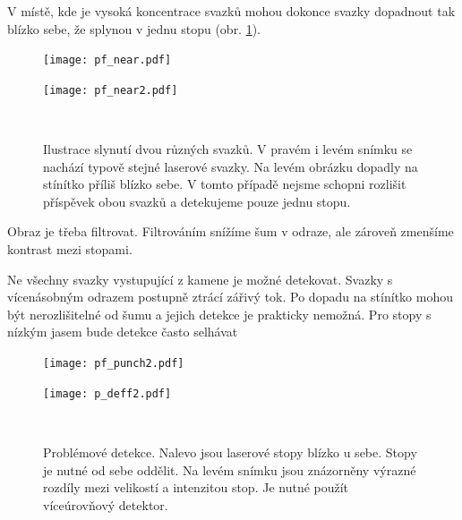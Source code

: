 V místě, kde je vysoká koncentrace svazků mohou dokonce svazky dopadnout tak blízko sebe, že splynou v jednu stopu (obr. \ref{Splynuti}).  

\begin{figure}[htbp]
    \centering
    \begin{minipage}[c]{0.48\textwidth}
        \centering\texttt{[image: pf\_near.pdf]}
    \end{minipage}
    \begin{minipage}[c]{0.48\textwidth}
        \centering\texttt{[image: pf\_near2.pdf]}
    \end{minipage}
    \\
        \caption[Slynutí dvou různých svazků.]{Ilustrace slynutí dvou různých svazků. V pravém i levém snímku se nachází typově stejné laserové svazky. Na levém obrázku dopadly na stínítko příliš blízko sebe. V tomto případě nejsme schopni rozlišit příspěvek obou svazků a detekujeme pouze jednu stopu.}
        \label{Splynuti}
\end{figure}

Obraz je třeba filtrovat. Filtrováním snížíme šum v odraze, ale zároveň zmenšíme kontrast mezi stopami. 

Ne všechny svazky vystupující z kamene je možné detekovat. Svazky s vícenásobným odrazem postupně ztrácí zářivý tok. Po dopadu na stínítko mohou být nerozlišitelné od šumu a jejich detekce je prakticky nemožná. Pro stopy s nízkým jasem bude detekce často selhávat

\begin{figure}[htbp]
    \centering
    \begin{minipage}[c]{0.48\textwidth}
        \centering\texttt{[image: pf\_punch2.pdf]}
    \end{minipage}
    \begin{minipage}[c]{0.48\textwidth}
        \centering\texttt{[image: p\_deff2.pdf]}
    \end{minipage}
    \\
        \caption[Problémové detekce.]{Problémové detekce. Nalevo jsou laserové stopy blízko u sebe. Stopy je nutné od sebe oddělit. Na levém snímku jsou znázorněny výrazné rozdíly mezi velikostí a intenzitou stop. Je nutné použít víceúrovňový detektor. }
        \label{fig:Detekce}
\end{figure}

\newcommand\x{4}
\newcommand\xx{0,155}

